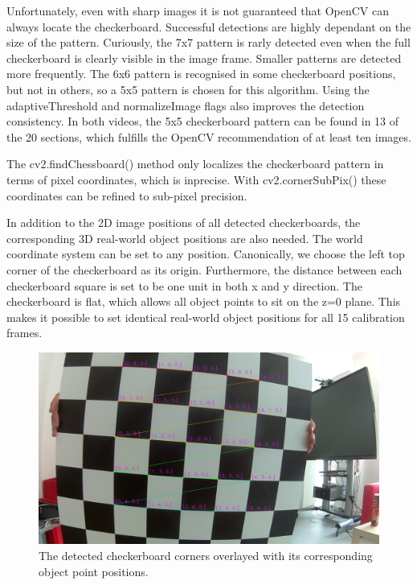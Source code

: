 \documentclass[bibliography=totoc]{scrartcl}
\begin{document}
Unfortunately, even with sharp images it is not guaranteed that OpenCV can always locate the checkerboard.
Successful detections are highly dependant on the size of the pattern. 
Curiously, the 7x7 pattern is rarly detected even when the full checkerboard is clearly visible in the image frame.
Smaller patterns are detected more frequently.
The 6x6 pattern is recognised in some checkerboard positions, but not in others, so a 5x5 pattern is chosen for this algorithm.
Using the adaptiveThreshold and normalizeImage flags also improves the detection consistency.
In both videos, the 5x5 checkerboard pattern can be found in 13 of the 20 sections, which fulfills the OpenCV recommendation of at least ten images.

The cv2.findChessboard() method only localizes the checkerboard pattern in terms of pixel coordinates, which is inprecise.
With cv2.cornerSubPix() these coordinates can be refined to sub-pixel precision.

In addition to the 2D image positions of all detected checkerboards, the corresponding 3D real-world object positions are also needed.
The world coordinate system can be set to any position. 
Canonically, we choose the left top corner of the checkerboard as its origin.
Furthermore, the distance between each checkerboard square is set to be one unit in both x and y direction. 
The checkerboard is flat, which allows all object points to sit on the z=0 plane.
This makes it possible to set identical real-world object positions for all 15 calibration frames.

\begin{figure}[ht!]
	\centering
	\includegraphics[width=\linewidth]{imgs/labeled_checkerboard.png}
	\caption{The detected checkerboard corners overlayed with its corresponding object point positions.}
	\label{fig:labeled_checkerboard}
\end{figure}
\end{document}
